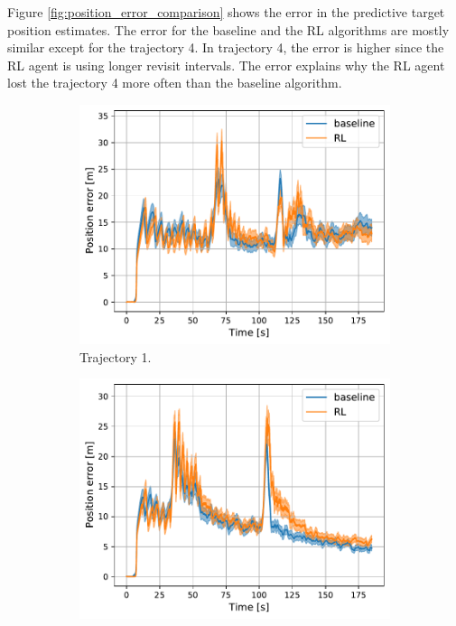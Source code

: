 \documentclass[english, 12pt, a4paper, elec, utf8, a-1b, online]{aaltothesis}
\begin{document}
Figure \ref{fig:position_error_comparison} shows the error in the predictive target position estimates.
The error for the baseline and the RL algorithms are mostly similar except for the trajectory 4.
In trajectory 4, the error is higher since the RL agent is using longer revisit intervals.
The error explains why the RL agent lost the trajectory 4 more often than the baseline algorithm.

\begin{figure}
    \centering
    \begin{subfigure}[b]{0.45\textwidth}
        \centering
        \includegraphics[width=\linewidth]{figures/benchmark/Simulations/mean_position_error0.pdf}
        \caption{Trajectory 1.}
        \label{fig:PE_T1}
    \end{subfigure}
    \hfill
    \begin{subfigure}[b]{0.45\textwidth}
        \centering
        \includegraphics[width=\linewidth]{figures/benchmark/Simulations/mean_position_error1.pdf}

\end{subfigure}
\end{figure}
\end{document}
